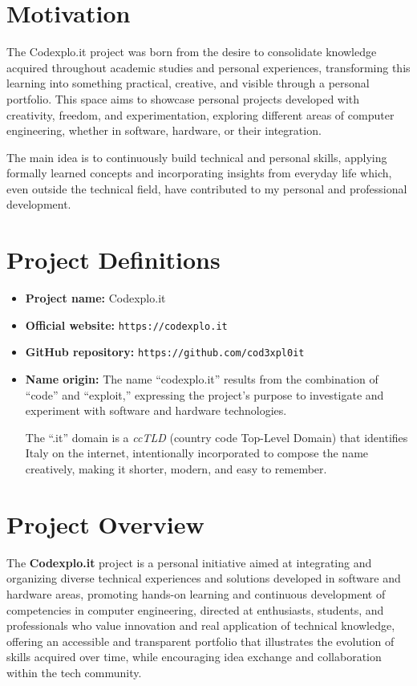 \documentclass[10pt, a4paper, oneside]{article}
\begin{document}
\section{Motivation}

The Codexplo.it project was born from the desire to consolidate knowledge acquired throughout academic studies and personal experiences, transforming this learning into something practical, creative, and visible through a personal portfolio. This space aims to showcase personal projects developed with creativity, freedom, and experimentation, exploring different areas of computer engineering, whether in software, hardware, or their integration.\newline

The main idea is to continuously build technical and personal skills, applying formally learned concepts and incorporating insights from everyday life which, even outside the technical field, have contributed to my personal and professional development.\newpage

\section{Project Definitions}

\begin{itemize}
  \item \textbf{Project name:} Codexplo.it  
  \item \textbf{Official website:} \texttt{https://codexplo.it}  
  \item \textbf{GitHub repository:} \texttt{https://github.com/cod3xpl0it}  
  \item \textbf{Name origin:}  
  The name “codexplo.it” results from the combination of “code” and “exploit,” expressing the project’s purpose to investigate and experiment with software and hardware technologies.\newline
  
  The “.it” domain is a \textit{ccTLD} (country code Top-Level Domain) that identifies Italy on the internet, intentionally incorporated to compose the name creatively, making it shorter, modern, and easy to remember.  
\end{itemize}

\section{Project Overview}

The \textbf{Codexplo.it} project is a personal initiative aimed at integrating and organizing diverse technical experiences and solutions developed in software and hardware areas, promoting hands-on learning and continuous development of competencies in computer engineering, directed at enthusiasts, students, and professionals who value innovation and real application of technical knowledge, offering an accessible and transparent portfolio that illustrates the evolution of skills acquired over time, while encouraging idea exchange and collaboration within the tech community.
\end{document}
